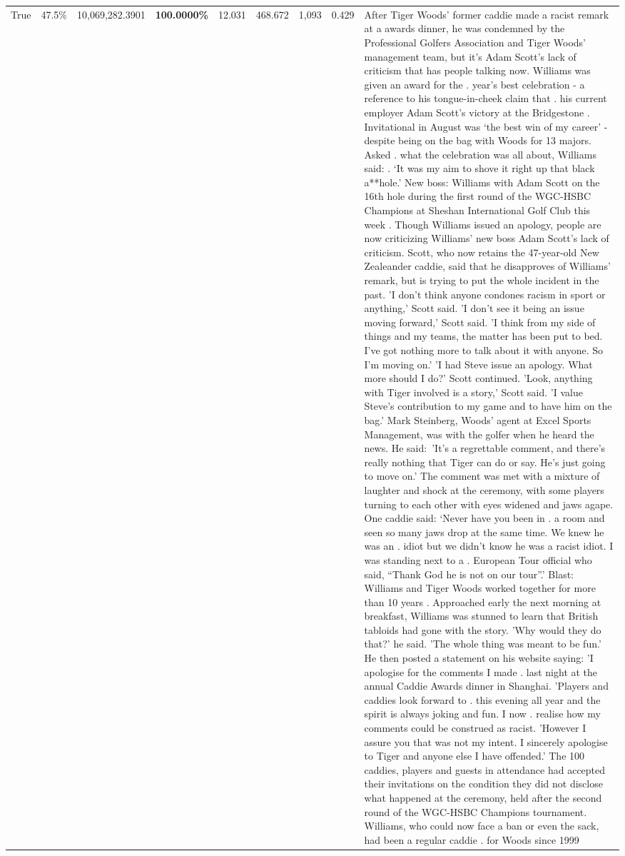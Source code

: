 \begin{table}[H]
\begin{tabular}{lllrlllll}
True & 47.5\% & 10,069,282.3901 & \bfseries \color{red} 100.0000\% & 12.031 & 468.672 & 1,093 & 0.429 & After Tiger Woods' former caddie made a racist remark at a awards dinner, he was condemned by the Professional Golfers Association and Tiger Woods' management team, but it's Adam Scott's lack of criticism that has people talking now. Williams was given an award for the . year’s best celebration - a reference to his tongue-in-cheek claim that . his current employer Adam Scott’s victory at the Bridgestone . Invitational in August was ‘the best win of my career’ - despite being on the bag with Woods for 13 majors. Asked . what the celebration was all about, Williams said: . ‘It was my aim to shove it right up that black a**hole.’ New boss: Williams with Adam Scott  on the 16th hole during the first round of the WGC-HSBC Champions at Sheshan International Golf Club this week . Though Williams issued an apology, people are now criticizing Williams' new boss Adam Scott's lack of criticism. Scott, who now retains the 47-year-old New Zealeander caddie, said that he disapproves of Williams' remark, but is trying to put the whole incident in the past. 'I don't think anyone condones racism in sport or anything,' Scott said. 'I don't see it being an issue moving forward,' Scott said. 'I think from my side of things and my teams, the matter has been put to bed. I've got nothing more to talk about it with anyone. So I'm moving on.' 'I had Steve issue an apology. What more should I do?' Scott continued. 'Look, anything with Tiger involved is a story,' Scott said. 'I value Steve's contribution to my game and to have him on the bag.' Mark Steinberg, Woods' agent at Excel Sports Management, was with the golfer when he heard the news. He said: 'It's a regrettable comment, and there's really nothing that Tiger can do or say. He's just going to move on.' The comment was met with a mixture of laughter and shock at the ceremony, with some players turning to each other with eyes widened and jaws agape. One caddie said: ‘Never have you been in . a room and seen so many jaws drop at the same time. We knew he was an . idiot but we didn’t know he was a racist idiot. I was standing next to a . European Tour official who said, “Thank God he is not on our tour”.’ Blast: Williams and Tiger Woods worked together for more than 10 years . Approached early the next morning at breakfast, Williams was stunned to learn that British tabloids had gone with the story. 'Why would they do that?' he said. 'The whole thing was meant to be fun.' He then posted a statement on his website saying: 'I apologise for the comments I made . last night at the annual Caddie Awards dinner in Shanghai. 'Players and caddies look forward to . this evening all year and the spirit is always joking and fun. I now . realise how my comments could be construed as racist. 'However I assure you that was not my intent. I sincerely apologise to Tiger and anyone else I have offended.' The 100 caddies, players and guests in attendance had accepted their invitations on the condition they did not disclose what happened at the ceremony, held after the second round of the WGC-HSBC Champions tournament. Williams, who could now face a ban or even the sack, had been a regular caddie . for Woods since 1999 
\end{tabular}
\end{table}
